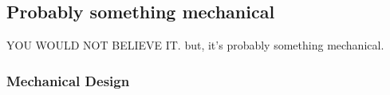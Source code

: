 \subsection{Probably something mechanical}
YOU WOULD NOT BELIEVE IT. but, it's probably something mechanical.

\subsubsection{Mechanical Design}


